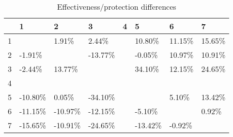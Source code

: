 \begin{table}[ht]
\centering
\begin{tabular}{rlllllll}
  \hline
 & 1 & 2 & 3 & 4 & 5 & 6 & 7 \\ 
  \hline
1 &  & 1.91\% & 2.44\% &  & 10.80\% & 11.15\% & 15.65\% \\ 
  2 & -1.91\% &  & -13.77\% &  & -0.05\% & 10.97\% & 10.91\% \\ 
  3 & -2.44\% & 13.77\% &  &  & 34.10\% & 12.15\% & 24.65\% \\ 
  4 &  &  &  &  &  &  &  \\ 
  5 & -10.80\% & 0.05\% & -34.10\% &  &  & 5.10\% & 13.42\% \\ 
  6 & -11.15\% & -10.97\% & -12.15\% &  & -5.10\% &  & 0.92\% \\ 
  7 & -15.65\% & -10.91\% & -24.65\% &  & -13.42\% & -0.92\% &  \\ 
   \hline
\end{tabular}
\caption{Effectiveness/protection differences} 
\end{table}
